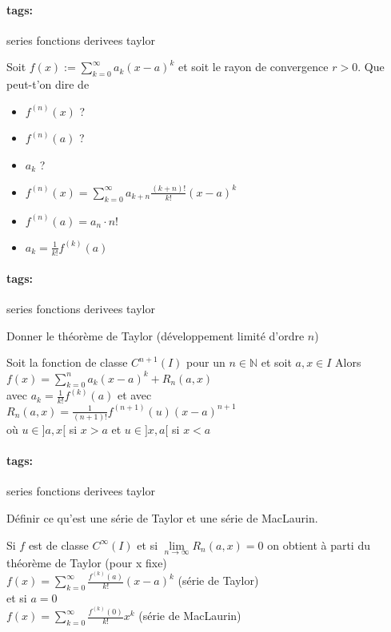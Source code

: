 \documentclass[12pt]{article}
\newcommand*{\xfield}[1]{\begin{mdframed}\centering #1\end{mdframed}\bigskip}
\newenvironment{note}{}{}
\newcommand*{\tags}[1]{\paragraph{tags: }#1}
\begin{document}
\begin{note}
	\tags{series fonctions derivees taylor}
	\xfield{Soit $f(x) :=  \sum\limits^{\infty}_{k=0}a_k (x-a)^k$ et soit le rayon de convergence $r > 0$. Que peut-t'on dire de
	\begin{itemize}
		\item $f^{(n)}(x)$ ?
		\item $f^{(n)}(a)$ ?
		\item $a_k$ ?
	\end{itemize}}
	\xfield{\begin{itemize}
		\item $f^{(n)}(x) =  \sum\limits^{\infty}_{k=0} a_{k+n} \frac{(k+n)!}{k!} (x-a)^k$
		\item $f^{(n)}(a) = a_n \cdot n!$
		\item $a_k = \frac{1}{k!} f^{(k)}(a)$
	\end{itemize} }
\end{note}

\begin{note}
	\tags{series fonctions derivees taylor}
	\xfield{Donner le théorème de Taylor (développement limité d'ordre $n$)}
	\xfield{Soit la fonction de classe $C^{n+1}(I)$ pour un $n \in \mathbb{N}$ et soit $a,x \in I$ Alors\\
	$f(x) = \sum\limits^{n}_{k=0} a_k (x-a)^k + R_n(a,x)$\\
	avec $a_k = \frac{1}{k!} f^{(k)}(a)$ et avec\\
	$R_n(a,x) = \frac{1}{(n+1)!} f^{(n+1)}(u) (x-a)^{n+1}$\\
	où $u \in ]a,x[$ si $x>a$ et $u \in ]x,a[$ si $x<a$}
\end{note}

\begin{note}
	\tags{series fonctions derivees taylor}
	\xfield{Définir ce qu'est une série de Taylor et une série de MacLaurin.}
	\xfield{Si $f$ est de classe $C^{\infty}(I)$ et si $\lim\limits_{n \to \infty} R_n(a,x)=0$ on obtient à parti du théorème de Taylor (pour x fixe)\\
	$f(x) = \sum\limits^{\infty}_{k=0} \frac{f^{(k)}(a)}{k!}(x-a)^k$ (série de Taylor)\\
	et si $a=0$\\
	$f(x) = \sum\limits^{\infty}_{k=0} \frac{f^{(k)}(0)}{k!}x^k$ (série de MacLaurin)}
\end{note}
\end{document}
